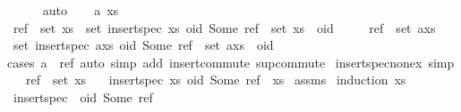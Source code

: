 \begin{isabellebody}
\ \ \ \ \isamarkupfalse%
\ auto\isanewline
{}\isamarkupfalse%
\isanewline
\ \ \isamarkupfalse%
\ a\ xs\isanewline
\ \ \isamarkupfalse%
\ {\isachardoublequoteopen}ref\ {\isasymin}\ set\ xs\ {\isasymLongrightarrow}\ set\ {\isacharparenleft}insert{\isacharunderscore}spec\ xs\ {\isacharparenleft}oid{\isacharcomma}\ Some\ ref{\isacharparenright}{\isacharparenright}\ {\isacharequal}\ set\ xs\ {\isasymunion}\ {\isacharbraceleft}oid{\isacharbraceright}{\isachardoublequoteclose}\isanewline
\ \ \ \ \ {\isachardoublequoteopen}ref\ {\isasymin}\ set\ {\isacharparenleft}a{\isacharhash}xs{\isacharparenright}{\isachardoublequoteclose}\isanewline
\ \ \isamarkupfalse%
\ {\isachardoublequoteopen}set\ {\isacharparenleft}insert{\isacharunderscore}spec\ {\isacharparenleft}a{\isacharhash}xs{\isacharparenright}\ {\isacharparenleft}oid{\isacharcomma}\ Some\ ref{\isacharparenright}{\isacharparenright}\ {\isacharequal}\ set\ {\isacharparenleft}a{\isacharhash}xs{\isacharparenright}\ {\isasymunion}\ {\isacharbraceleft}oid{\isacharbraceright}{\isachardoublequoteclose}\isanewline
\ \ \ \ \isamarkupfalse%
{\isacharparenleft}cases\ {\isachardoublequoteopen}a\ {\isacharequal}\ ref{\isachardoublequoteclose}{\isacharcomma}\ auto\ simp\ add{\isacharcolon}\ insert{\isacharunderscore}commute\ sup{\isacharunderscore}commute{\isacharparenright}\isanewline
{}\isamarkupfalse%
%
\endisatagproof
{\isafoldproof}%
%
\isadelimproof
\isanewline
%
\endisadelimproof
\isanewline
{}\isamarkupfalse%
\ insert{\isacharunderscore}spec{\isacharunderscore}nonex\ {\isacharbrackleft}simp{\isacharbrackright}{\isacharcolon}\isanewline
\ \ \ {\isachardoublequoteopen}ref\ {\isasymnotin}\ set\ xs{\isachardoublequoteclose}\isanewline
\ \ \ {\isachardoublequoteopen}insert{\isacharunderscore}spec\ xs\ {\isacharparenleft}oid{\isacharcomma}\ Some\ ref{\isacharparenright}\ {\isacharequal}\ xs{\isachardoublequoteclose}\isanewline
%
\isadelimproof
%
\endisadelimproof
%
\isatagproof
{}\isamarkupfalse%
\ assms\ \isamarkupfalse%
{\isacharparenleft}induction\ xs{\isacharparenright}\isanewline
\ \ \isamarkupfalse%
\ {\isachardoublequoteopen}insert{\isacharunderscore}spec\ {\isacharbrackleft}{\isacharbrackright}\ {\isacharparenleft}oid{\isacharcomma}\ Some\ ref{\isacharparenright}\ {\isacharequal}\ {\isacharbrackleft}{\isacharbrackright}{\isachardoublequoteclose}\isanewline
\ \ \ \ \isamarkupfalse%

\end{isabellebody}

